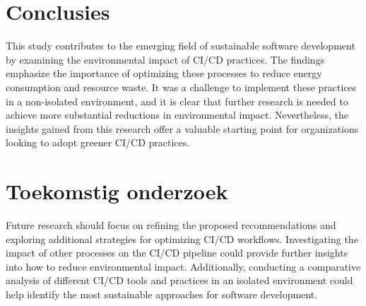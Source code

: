 \documentclass[a0,portrait]{hogent-poster}
\begin{document}
\begin{multicols}{2}

\section{Conclusies}
This study contributes to the emerging field of sustainable software development by examining the environmental impact of CI/CD practices. The findings emphasize the importance of optimizing these processes to reduce energy consumption and resource waste. It was a challenge to implement these practices in a non-isolated environment, and it is clear that further research is needed to achieve more substantial reductions in environmental impact. Nevertheless, the insights gained from this research offer a valuable starting point for organizations looking to adopt greener CI/CD practices.

\section{Toekomstig onderzoek}
Future research should focus on refining the proposed recommendations and exploring additional strategies for optimizing CI/CD workflows. Investigating the impact of other processes on the CI/CD pipeline could provide further insights into how to reduce environmental impact. Additionally, conducting a comparative analysis of different CI/CD tools and practices in an isolated environment could help identify the most sustainable approaches for software development.

\end{multicols}
\end{document}
